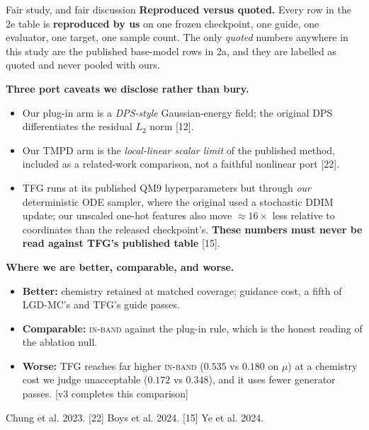 \documentclass[aspectratio=169,10pt]{beamer}
\newcommand{\theslidelabel}{}
\newcommand{\lbl}[1]{\renewcommand{\theslidelabel}{#1}}
\newcommand{\srcs}[1]{\vfill{\raggedleft\color{grayt}\fontsize{4.9}{5.6}\selectfont #1\par}}
\newcommand{\TODO}[1]{\textcolor{accent}{\scriptsize[#1]}}
\newcommand{\ib}{\textsc{in-band}}
\begin{document}
\lbl{2e}
\begin{frame}[shrink=15]{Fair study, and fair discussion}
  \textbf{Reproduced versus quoted.} Every row in the 2e table is
  \textbf{reproduced by us} on one frozen checkpoint, one guide, one evaluator, one
  target, one sample count. The only \emph{quoted} numbers anywhere in this study
  are the published base-model rows in 2a, and they are labelled as quoted and never
  pooled with ours.

  \medskip
  \textbf{Three port caveats we disclose rather than bury.}
  \begin{itemize}\setlength\itemsep{0.1em}
    \item Our plug-in arm is a \emph{DPS-style} Gaussian-energy field; the original
      DPS differentiates the residual $L_2$ norm [12].
    \item Our TMPD arm is the \emph{local-linear scalar limit} of the published
      method, included as a related-work comparison, not a faithful nonlinear
      port [22].
    \item TFG runs at its published QM9 hyperparameters but through \emph{our}
      deterministic ODE sampler, where the original used a stochastic DDIM update;
      our unscaled one-hot features also move $\approx16\times$ less relative to
      coordinates than the released checkpoint's. \textbf{These numbers must never be
      read against TFG's published table} [15].
  \end{itemize}

  \medskip
  \textbf{Where we are better, comparable, and worse.}
  \begin{itemize}\setlength\itemsep{0.1em}
    \item \textbf{Better:} chemistry retained at matched coverage; guidance cost, a
      fifth of LGD-MC's and TFG's guide passes.
    \item \textbf{Comparable:} \ib{} against the plug-in rule, which is the honest
      reading of the ablation null.
    \item \textbf{Worse:} TFG reaches far higher \ib{} ($0.535$ vs $0.180$ on $\mu$)
      at a chemistry cost we judge unacceptable ($0.172$ vs $0.348$), and it uses
      fewer generator passes. \TODO{v3 completes this comparison}
  \end{itemize}

  \srcs{[12] Chung et al. 2023. [22] Boys et al. 2024. [15] Ye et al. 2024.}
\end{frame}
\end{document}
